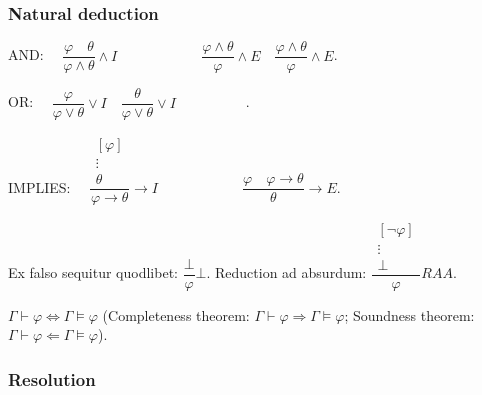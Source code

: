 \documentclass[]{article}
\begin{document}
\subsubsection{Natural deduction}

\noindent AND: $\hspace{1em} \dfrac{\varphi \hspace{1em} \theta}{\varphi \land \theta}\land I \hspace{5em} \hspace{1em} \dfrac{\varphi \land \theta}{\varphi}\land E \hspace{1em} \dfrac{\varphi \land \theta}{\varphi}\land E$.

\noindent OR: $\hspace{1em} \dfrac{\varphi}{\varphi \lor \theta}\lor I \hspace{1em} \dfrac{\theta}{\varphi \lor \theta}\lor I \hspace{5em} $.

\noindent IMPLIES: $\hspace{1em} \dfrac{\begin{array}{c} [\varphi] \\ \vdots \\ \theta \end{array}}{\varphi \rightarrow \theta} \rightarrow I \hspace{5em} \hspace{1em} \dfrac{\varphi \hspace{1em} \varphi \rightarrow \theta}{\theta} \rightarrow E $.

\noindent Ex falso sequitur quodlibet: $\dfrac{\bot}{\varphi}\bot$. Reduction ad absurdum: $\dfrac{\begin{array}{c} [\neg \varphi] \\ \vdots \\ \bot \end{array}}{\varphi} RAA$.


\noindent $\Gamma \vdash \varphi \iff \Gamma \vDash \varphi$ (Completeness theorem: $\Gamma \vdash \varphi \Rightarrow \Gamma \vDash \varphi$; Soundness theorem: $\Gamma \vdash \varphi \Leftarrow \Gamma \vDash \varphi$).

\subsubsection{Resolution}
\end{document}
